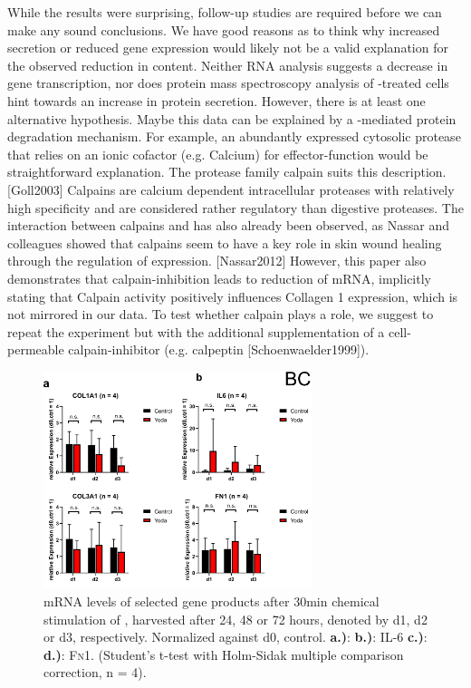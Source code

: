 While the results were surprising, follow-up studies are required before we can make any sound conclusions. We have good reasons as to think why increased secretion or reduced gene expression would likely not be a valid explanation for the observed reduction in \colone{} content. Neither RNA analysis suggests a decrease in gene transcription, nor does protein mass spectroscopy analysis of \Yoda{}-treated cells hint towards an increase in protein secretion. However, there is at least one alternative hypothesis. Maybe this data can be explained by a \Piezo{}-mediated protein degradation mechanism. For example, an abundantly expressed cytosolic protease that relies on an ionic cofactor (e.g. Calcium) for effector-function would be straightforward explanation. The protease family calpain suits this description. [Goll2003] Calpains are calcium dependent intracellular proteases with relatively high specificity and are considered rather regulatory than digestive proteases. The interaction between calpains and \colone has also already been observed, as Nassar and colleagues showed that calpains seem to have a key role in skin wound healing through the regulation of \colone{} expression. [Nassar2012] However, this paper also demonstrates that calpain-inhibition leads to reduction of \colone{} mRNA, implicitly stating that Calpain activity positively influences Collagen 1 expression, which is not mirrored in our data. To test whether calpain plays a role, we suggest to repeat the experiment but with the additional supplementation of a cell-permeable calpain-inhibitor (e.g. calpeptin [Schoenwaelder1999]).


\begin{figure}[ht]
\centering
\includegraphics[width = 0.7\textwidth]{NormalYodaExp_PCR.png}
\caption{mRNA levels of selected gene products after 30min chemical stimulation of \Piezo{}, harvested after 24, 48 or 72 hours, denoted by d1, d2 or d3, respectively. Normalized against d0, control.\hfill \newline
\textbf{a.)}: \colone{}
\textbf{b.)}: IL-6
\textbf{c.)}: \colthree{}
\textbf{d.)}: \textsc{Fn}1. 
(Student's t-test with Holm-Sidak multiple comparison correction, n = 4). 
}
\label{fig:Yoda_Norm_PCR}
\end{figure}


